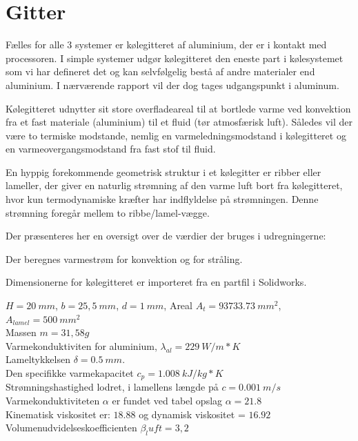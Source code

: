 \section{Gitter}

Fælles for alle 3 systemer er kølegitteret af aluminium, der er i kontakt med processoren. 
I simple systemer udgør kølegitteret den eneste part i kølesystemet som vi har defineret det og kan selvfølgelig bestå af andre materialer end aluminium. I nærværende rapport vil der dog tages udgangspunkt i aluminum.

Kølegitteret udnytter sit store overfladeareal til at bortlede varme ved konvektion fra et fast materiale (aluminium) til et fluid (tør atmosfærisk luft).
Således vil der være to termiske modstande, nemlig en varmeledningsmodstand i kølegitteret og en varmeovergangsmodstand fra fast stof til fluid.

En hyppig forekommende geometrisk struktur i et kølegitter er ribber eller lameller, der giver en naturlig strømning af den varme luft bort fra kølegitteret, hvor kun termodynamiske kræfter har indflyldelse på strømningen. Denne strømning foregår mellem to ribbe/lamel-vægge. 

Der præsenteres her en oversigt over de værdier der bruges i udregningerne: 

Der beregnes varmestrøm for konvektion og for stråling.

Dimensionerne for kølegitteret er importeret fra en partfil i Solidworks. %

$H = 20\ mm$, $b = 25,5\ mm$, $d = 1\ mm$, Areal $A_t = 93733.73\ mm^2$, $A_{lamel}= 500\ mm^2$  \\ 
Massen $m = 31,58 g$ \\
Varmekonduktiviten for aluminium, $\lambda_{al} = 229\ W/m*K$ \\  
Lameltykkelsen $\delta = 0.5\ mm.$  \\
Den specifikke varmekapacitet $c_{p} = 1.008\ kJ/kg*K$ \\
Strømningshastighed lodret, i lamellens længde på $c = 0.001\ m/s$ \\

Varmekonduktiviteten $\alpha$ er fundet ved tabel opslag $\alpha = 21.8$ \\
Kinematisk viskositet er: $18.88$ og dynamisk viskositet = $16.92$  \\
Volumenudvidelseskoefficienten $\beta_luft = 3,2$ \\
 
